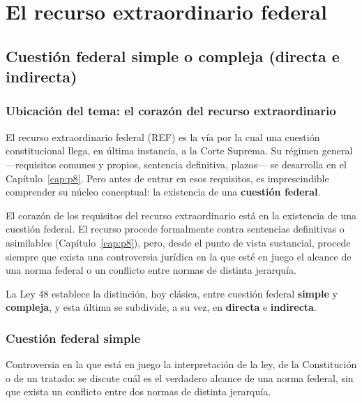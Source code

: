 \documentclass[12pt,oneside]{book}
\begin{document}
\part{El recurso extraordinario federal}

\chapter{Cuestión federal simple o compleja (directa e indirecta)}
\label{cap:p5}

\section{Ubicación del tema: el corazón del recurso extraordinario}

El recurso extraordinario federal (REF) es la vía por la cual una cuestión
constitucional llega, en última instancia, a la Corte Suprema. Su régimen general
—requisitos comunes y propios, sentencia definitiva, plazos— se desarrolla en el
Capítulo~\ref{cap:p8}. Pero antes de entrar en esos requisitos, es imprescindible
comprender su núcleo conceptual: la existencia de una \textbf{cuestión federal}.

\begin{impbox}
El corazón de los requisitos del recurso extraordinario está en la existencia de
una cuestión federal. El recurso procede formalmente contra sentencias definitivas
o asimilables (Capítulo~\ref{cap:p8}), pero, desde el punto de vista sustancial,
procede siempre que exista una controversia jurídica en la que esté en juego el
alcance de una norma federal o un conflicto entre normas de distinta jerarquía.
\end{impbox}

La Ley 48 establece la distinción, hoy clásica, entre cuestión federal
\textbf{simple} y \textbf{compleja}, y esta última se subdivide, a su vez, en
\textbf{directa} e \textbf{indirecta}.

\section{Cuestión federal simple}

\begin{defbox}
Controversia en la que está en juego la interpretación de la ley, de la
Constitución o de un tratado: se discute cuál es el verdadero alcance de una norma
federal, sin que exista un conflicto entre dos normas de distinta jerarquía.
\end{defbox}
\end{document}
